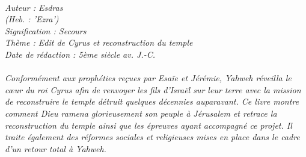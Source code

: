 \BFont
\noindent\hrulefill
{\footnotesize
\textit{
\bigskip
{\centering{}
\\Auteur : Esdras
\\(Heb. : 'Ezra')
\\Signification : Secours
\\Thème : Edit de Cyrus et reconstruction du temple 
\\Date de rédaction : 5ème siècle av. J.-C.\\}
}
\textit{
\\Conformément aux prophéties reçues par Esaïe et Jérémie, Yahweh réveilla le cœur du roi Cyrus afin de renvoyer les fils d’Israël sur leur terre avec la mission de reconstruire le temple détruit quelques décennies auparavant. Ce livre montre comment Dieu ramena glorieusement son peuple à Jérusalem et retrace la reconstruction du temple ainsi que les épreuves ayant accompagné ce projet. Il traite également des réformes sociales et religieuses mises en place dans le cadre d’un retour total à Yahweh.\bigskip
}
}
\par\nobreak\noindent\hrulefill
